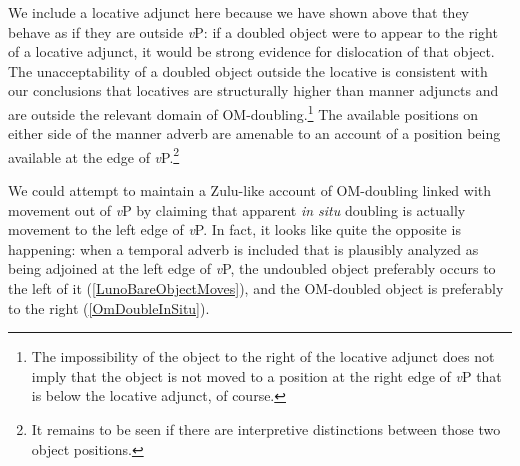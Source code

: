 \documentclass[output=paper]{langscibook}
\begin{document}
We include a locative adjunct here because we have shown above that they behave as if they are outside \textit{v}P: if a doubled object were to appear to the right of a locative adjunct, it would be strong evidence for dislocation of that object. The unacceptability of a doubled object outside the locative is consistent with our conclusions that locatives are structurally higher than manner adjuncts and are outside the relevant domain of OM-doubling.\footnote{The impossibility of the object to the right of the locative adjunct does not imply that the object is not moved to a position at the right edge of \textit{v}P that is below the locative adjunct, of course.} The available positions on either side of the manner adverb are amenable to an account of a position being available at the edge of \textit{v}P.\footnote{It remains to be seen if there are interpretive distinctions between those two object positions.}









We could attempt to maintain a Zulu-like account of OM-doubling linked with movement out of \textit{v}P by claiming that apparent \textit{in situ} doubling is actually movement to the left edge of \textit{v}P. In fact, it looks like quite the opposite is happening: when a temporal adverb is included that is plausibly analyzed as being adjoined at the left edge of \textit{v}P, the undoubled object preferably occurs to the left of it (\ref{LunoBareObjectMoves}), and the OM-doubled object is preferably to the right (\ref{OmDoubleInSitu}).
\end{document}
